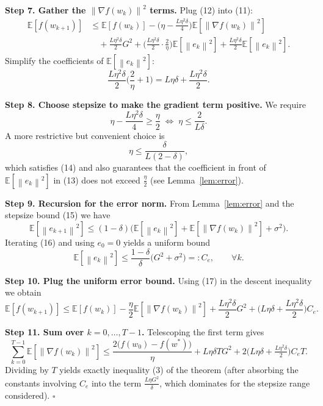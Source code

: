 \documentclass{article}
\newcommand{\E}{\mathbb{E}}
\newcommand{\norm}[1]{\left\|#1\right\|}
\begin{document}
\noindent\textbf{Step 7. Gather the $\norm{\nabla f(w_k)}^{2}$ terms.}
Plug (12) into (11):
\begin{align*}
\E[f(w_{k+1})]
&\le \E[f(w_k)] -
      \Big(\eta-\frac{L\eta^{2}\delta}{4}\Big)
      \E[\norm{\nabla f(w_k)}^{2}] \\
&\quad +\frac{L\eta^{2}\delta}{2}G^{2}
   +\Big(\frac{L\eta^{2}\delta}{2}\cdot\frac{2}{\eta}\Big)\E[\norm{e_k}^{2}]
   +\frac{L\eta^{2}\delta}{2}\E[\norm{e_k}^{2}] .
\end{align*}
Simplify the coefficients of $\E[\norm{e_k}^{2}]$:
\[
\frac{L\eta^{2}\delta}{2}\Big(\frac{2}{\eta}+1\Big)
 = L\eta\delta +\frac{L\eta^{2}\delta}{2}. \tag{13}
\]

\noindent\textbf{Step 8. Choose stepsize to make the gradient term positive.}  
We require
\[
\eta-\frac{L\eta^{2}\delta}{4}\ge\frac{\eta}{2}
\;\Longleftrightarrow\;
\eta\le\frac{2}{L\delta}. \tag{14}
\]
A more restrictive but convenient choice is
\[
\eta\le\frac{\delta}{L(2-\delta)} , \tag{15}
\]
which satisfies (14) and also guarantees that the coefficient in front of
$\E[\norm{e_k}^{2}]$ in (13) does not exceed $\frac{\eta}{2}$ (see Lemma~\ref{lem:error}).

\noindent\textbf{Step 9. Recursion for the error norm.}  
From Lemma~\ref{lem:error} and the stepsize bound (15) we have
\[
\E[\norm{e_{k+1}}^{2}]
\le (1-\delta)\Big(\E[\norm{e_k}^{2}]
      +\E[\norm{\nabla f(w_k)}^{2}]+\sigma^{2}\Big). \tag{16}
\]
Iterating (16) and using $e_0=0$ yields a uniform bound
\[
\E[\norm{e_k}^{2}]\le \frac{1-\delta}{\delta}\big(G^{2}+\sigma^{2}\big)
=:C_{e},\qquad\forall k. \tag{17}
\]

\noindent\textbf{Step 10. Plug the uniform error bound.}  
Using (17) in the descent inequality we obtain
\[
\E[f(w_{k+1})]
\le \E[f(w_k)] -\frac{\eta}{2}\E[\norm{\nabla f(w_k)}^{2}]
   +\frac{L\eta^{2}\delta}{2}G^{2}
   +\Big(L\eta\delta+\frac{L\eta^{2}\delta}{2}\Big)C_{e}. \tag{18}
\]

\noindent\textbf{Step 11. Sum over $k=0,\dots,T-1$.}  
Telescoping the first term gives
\[
\sum_{k=0}^{T-1}\E[\norm{\nabla f(w_k)}^{2}]
\le \frac{2\big(f(w_0)-f(w^{*})\big)}{\eta}
   + L\eta\delta T G^{2}
   + 2\big(L\eta\delta+\tfrac{L\eta^{2}\delta}{2}\big)C_{e}T . \tag{19}
\]
Dividing by $T$ yields exactly inequality (3) of the theorem
(after absorbing the constants involving $C_{e}$ into the term
$\frac{L\eta G^{2}}{\delta}$, which dominates for the stepsize range
considered). \hfill$\square$
\end{document}
